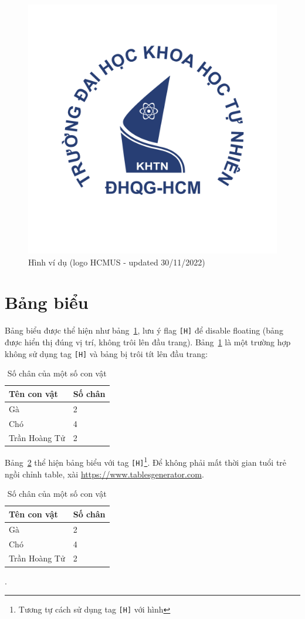 \begin{figure}[H]
    \centering
    \includegraphics[scale=.4]{img/hcmus-logo.png}
    \caption{Hình ví dụ (logo HCMUS - updated 30/11/2022)}
    \label{fig:my_label_with_H}
\end{figure}

\section{Bảng biểu}
Bảng biểu được thể hiện như bảng~\ref{tab:my_label}, lưu ý flag \texttt{[H]} để disable floating (bảng được hiển thị đúng vị trí, không trôi lên đầu trang). Bảng~\ref{tab:my_label} là một trường hợp không sử dụng tag \texttt{[H]} và bảng bị trôi tít lên đầu trang:
\begin{table}%
\centering
\begin{tabular}{|l|l|}
\hline
\textbf{Tên con vật} & \textbf{Số chân} \\ \hline
Gà & 2 \\ \hline
Chó & 4 \\ \hline
Trần Hoàng Tử & 2 \\ \hline
\end{tabular}
\caption{Số chân của một số con vật}
\label{tab:my_label}
\end{table}

Bảng~\ref{tab:my_label_with_H_tag} thể hiện bảng biểu với tag \texttt{[H]}\footnote{Tương tự cách sử dụng tag \texttt{[H]} với hình}. Để không phải mất thời gian tuổi trẻ ngồi chỉnh table, xài \href{https://www.tablesgenerator.com}{https://www.tablesgenerator.com}.

\begin{table}[H]
\centering
\begin{tabular}{|l|l|}
\hline
\textbf{Tên con vật} & \textbf{Số chân} \\ \hline
Gà & 2 \\ \hline
Chó & 4 \\ \hline
Trần Hoàng Tử & 2 \\ \hline
\end{tabular}
\caption{Số chân của một số con vật}
\label{tab:my_label_with_H_tag}
\end{table}.